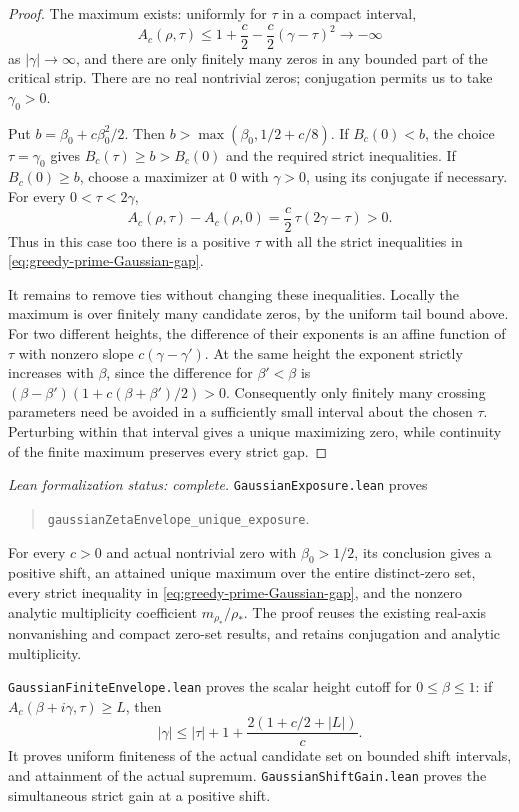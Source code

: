 \documentclass[11pt]{article}
\theoremstyle{definition}
\begin{document}
\begin{proof}
The maximum exists: uniformly for $\tau$ in a compact interval,
\[
 A_c(\rho,\tau)\le1+\frac c2-\frac c2(\gamma-\tau)^2
                                      \longrightarrow-\infty
\]
as $|\gamma|\to\infty$, and there are only finitely many zeros in
any bounded part of the critical strip.
There are no real nontrivial zeros; conjugation permits us to
take $\gamma_0>0$.

Put $b=\beta_0+c\beta_0^2/2$.
Then $b>\max(\beta_0,1/2+c/8)$.
If $B_c(0)<b$, the choice $\tau=\gamma_0$ gives
$B_c(\tau)\ge b>B_c(0)$ and the required strict inequalities.
If $B_c(0)\ge b$, choose a maximizer at $0$ with $\gamma>0$,
using its conjugate if necessary.
For every $0<\tau<2\gamma$,
\[
 A_c(\rho,\tau)-A_c(\rho,0)
                =\frac c2\,\tau(2\gamma-\tau)>0.
\]
Thus in this case too there is a positive $\tau$ with all the
strict inequalities in \eqref{eq:greedy-prime-Gaussian-gap}.

It remains to remove ties without changing these inequalities.
Locally the maximum is over finitely many candidate zeros, by the
uniform tail bound above.
For two different heights, the difference of their exponents is
an affine function of $\tau$ with nonzero slope
$c(\gamma-\gamma')$.
At the same height the exponent strictly increases with $\beta$,
since the difference for $\beta'<\beta$ is
$(\beta-\beta')(1+c(\beta+\beta')/2)>0$.
Consequently only finitely many crossing parameters need be avoided
in a sufficiently small interval about the chosen $\tau$.
Perturbing within that interval gives a unique maximizing zero,
while continuity of the finite maximum preserves every strict gap.
\end{proof}

\emph{Lean formalization status: complete.}
\texttt{GaussianExposure.lean} proves
\begin{quote}
\texttt{gaussianZetaEnvelope\_\allowbreak unique\_exposure}.
\end{quote}
For every $c>0$ and actual nontrivial zero with $\beta_0>1/2$,
its conclusion gives a positive shift, an attained unique maximum
over the entire distinct-zero set, every strict inequality in
\eqref{eq:greedy-prime-Gaussian-gap}, and the nonzero analytic
multiplicity coefficient $m_{\rho_*}/\rho_*$.
The proof reuses the existing real-axis nonvanishing and compact
zero-set results, and retains conjugation and analytic multiplicity.

\texttt{GaussianFiniteEnvelope.lean} proves the scalar height cutoff
for $0\le\beta\le1$: if $A_c(\beta+i\gamma,\tau)\ge L$, then
\[
 |\gamma|\le |\tau|+1+\frac{2(1+c/2+|L|)}c.
\]
It proves uniform finiteness of the actual candidate set on bounded
shift intervals, and attainment of the actual supremum.
\texttt{GaussianShiftGain.lean} proves the
simultaneous strict gain at a positive shift.
\end{document}
